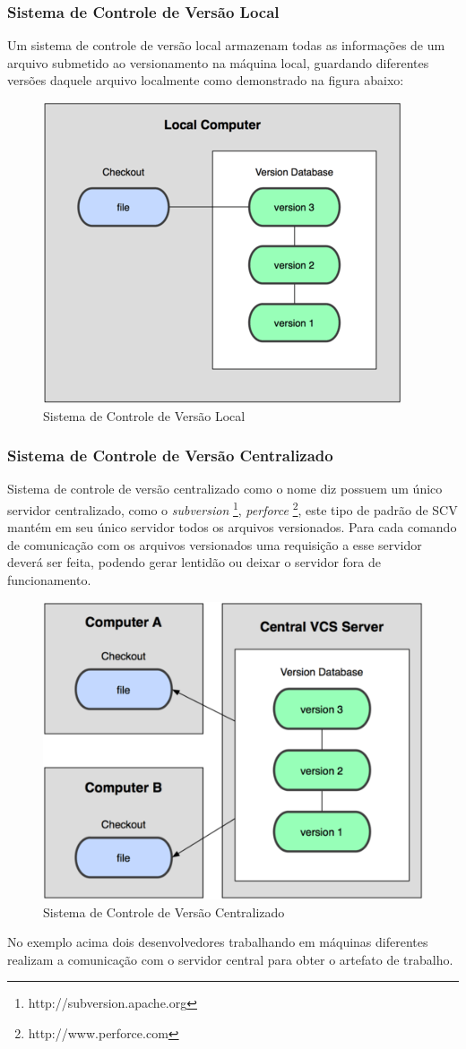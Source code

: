 \subsubsection{Sistema de Controle de Versão Local}
Um sistema de controle de versão local	armazenam todas as informações de um arquivo submetido ao versionamento na máquina local, guardando diferentes versões daquele arquivo localmente como demonstrado na figura abaixo:
\begin{figure}[tbh]
\centering
\includegraphics[width=0.7\linewidth]{./images/scvlocal}
\caption[Sistema de Controle de Versão Local]{Sistema de Controle de Versão Local}
\label{fig:SCVLocal}
\end{figure}
\subsubsection{Sistema de Controle de Versão Centralizado} Sistema de controle de versão centralizado como o nome diz possuem um único servidor centralizado, como o \textit{subversion} \footnote{http://subversion.apache.org}, \textit{perforce} \footnote{http://www.perforce.com}, este tipo de padrão de SCV mantém em seu único servidor todos os arquivos versionados. Para cada comando de comunicação com os arquivos versionados uma requisição a esse servidor deverá ser feita, podendo gerar lentidão ou deixar o servidor fora de funcionamento.
\begin{figure}[tbh]
\centering
\includegraphics[width=0.7\linewidth]{./images/scvcentral}
\caption[Sistema de Controle de Versão Centralizado]{Sistema de Controle de Versão Centralizado}
\label{fig:SCVCentral}
\end{figure}
No exemplo acima dois desenvolvedores trabalhando em máquinas diferentes realizam a comunicação com o servidor central para obter o artefato de trabalho.	
